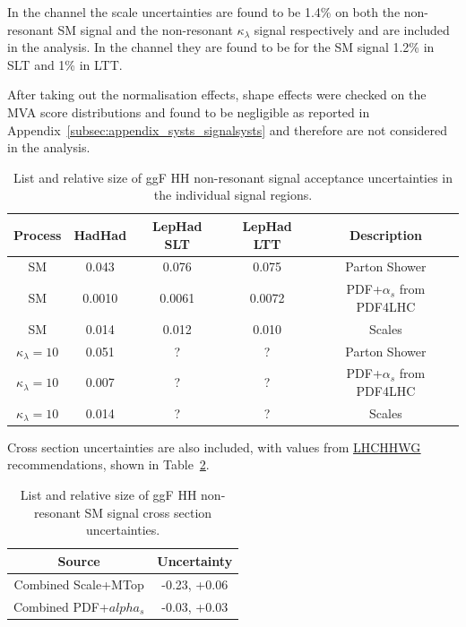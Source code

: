 In the \hadhad channel the scale uncertainties are found to be 1.4\% on both the non-resonant SM signal and the non-resonant $\kappa_\lambda$ signal respectively and are included in the analysis.  In the \lephad channel they are found to be for the SM signal 1.2\% in SLT and 1\% in LTT.

After taking out the normalisation effects, shape effects were checked on the MVA score distributions and found to be negligible as reported in Appendix~\ref{subsec:appendix_systs_signalsysts} and therefore are not considered in the analysis.



\begin{table}
\centering
\small
\begin{tabular}{|c|c|c|c|c|}
\hline
Process & HadHad & LepHad SLT & LepHad LTT & Description\\
\hline
SM  & 0.043 &  0.076 & 0.075 & Parton Shower\\
SM & 0.0010 &  0.0061 &  0.0072 & PDF+$\alpha_s$ from PDF4LHC\\ 
SM & 0.014 &  0.012 &  0.010 & Scales \\
$\kappa_\lambda=10$ & 0.051 &  ? & ? & Parton Shower\\
$\kappa_\lambda=10$ & 0.007 &  ? &  ? & PDF+$\alpha_s$ from PDF4LHC\\ 
$\kappa_\lambda=10$ & 0.014 &  ? &  ? & Scales \\
\hline
\end{tabular}
\caption{List and relative size of ggF HH non-resonant signal acceptance uncertainties in the individual signal regions.}
\label{sec:systs:tab:systematics_HHNonResSignal_AcceptanceNumbers}
\end{table}

Cross section uncertainties are also included, with values from \href{https://twiki.cern.ch/twiki/bin/view/LHCPhysics/LHCHWGHH?redirectedfrom=LHCPhysics.LHCHXSWGHH#Latest_recommendations_for_gluon}{\underline{LHCHHWG}} recommendations, shown in Table~\ref{sec:systs:tab:systematics_HHNonResSignal_XSecNumbers}.

\begin{table}
\centering
\small
\begin{tabular}{|c|c|}
\hline
Source & Uncertainty\\
\hline
Combined Scale+MTop & -0.23, +0.06\\
Combined PDF+$alpha_s$ & -0.03, +0.03\\
\hline
\end{tabular}
\caption{List and relative size of ggF HH non-resonant SM signal cross section uncertainties.}
\label{sec:systs:tab:systematics_HHNonResSignal_XSecNumbers}
\end{table}


